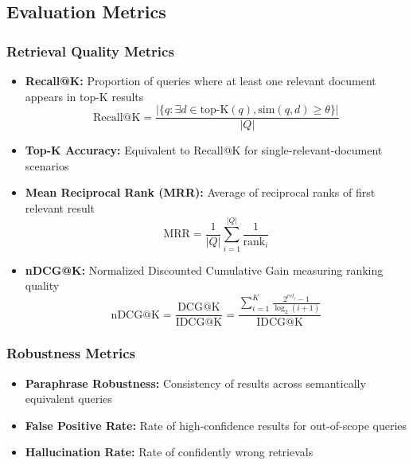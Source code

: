 \documentclass[11pt,a4paper]{article}
\begin{document}
\subsection{Evaluation Metrics}

\subsubsection{Retrieval Quality Metrics}

\begin{itemize}[leftmargin=*]
    \item \textbf{Recall@K:} Proportion of queries where at least one relevant document appears in top-K results
    \begin{equation}
        \text{Recall@K} = \frac{|\{q : \exists d \in \text{top-K}(q), \text{sim}(q,d) \geq \theta\}|}{|Q|}
    \end{equation}
    
    \item \textbf{Top-K Accuracy:} Equivalent to Recall@K for single-relevant-document scenarios
    
    \item \textbf{Mean Reciprocal Rank (MRR):} Average of reciprocal ranks of first relevant result
    \begin{equation}
        \text{MRR} = \frac{1}{|Q|} \sum_{i=1}^{|Q|} \frac{1}{\text{rank}_i}
    \end{equation}
    
    \item \textbf{nDCG@K:} Normalized Discounted Cumulative Gain measuring ranking quality
    \begin{equation}
        \text{nDCG@K} = \frac{\text{DCG@K}}{\text{IDCG@K}} = \frac{\sum_{i=1}^{K} \frac{2^{rel_i} - 1}{\log_2(i+1)}}{\text{IDCG@K}}
    \end{equation}
\end{itemize}

\subsubsection{Robustness Metrics}

\begin{itemize}[leftmargin=*]
    \item \textbf{Paraphrase Robustness:} Consistency of results across semantically equivalent queries
    \item \textbf{False Positive Rate:} Rate of high-confidence results for out-of-scope queries
    \item \textbf{Hallucination Rate:} Rate of confidently wrong retrievals
\end{itemize}
\end{document}
